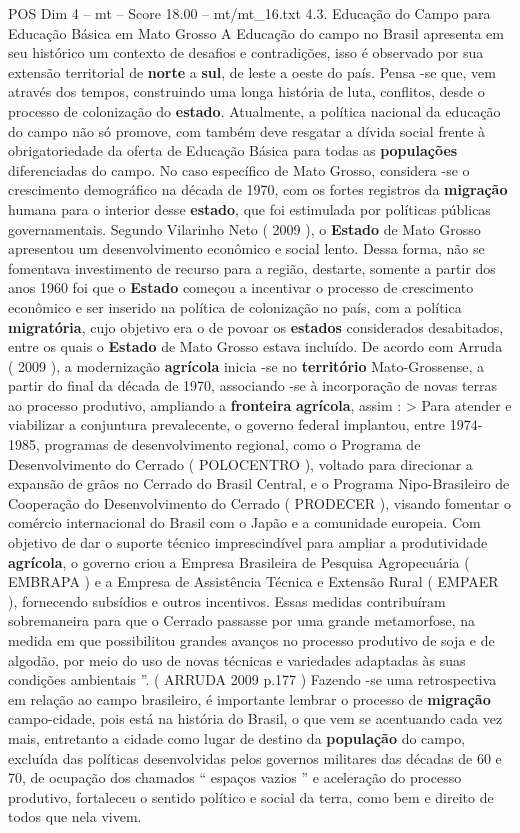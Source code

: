 \begin{textsample}{POS Dim 4 – mt – Score 18.00 – mt/mt\_16.txt}  \label{ex:f4_pos_171}
4.3.
Educação do Campo para Educação Básica em Mato Grosso A Educação do campo no Brasil apresenta em seu histórico um contexto de desafios e contradições, isso é observado por sua extensão territorial de \textbf{norte} a \textbf{sul}, de leste a oeste do país.
Pensa -se que, vem através dos tempos, construindo uma longa história de luta, conflitos, desde o processo de colonização do \textbf{estado}.
Atualmente, a política nacional da educação do campo não só promove, com também deve resgatar a dívida social frente à obrigatoriedade da oferta de Educação Básica para todas as \textbf{populações} diferenciadas do campo.
No caso específico de Mato Grosso, considera -se o crescimento demográfico na década de 1970, com os fortes registros da \textbf{migração} humana para o interior desse \textbf{estado}, que foi estimulada por políticas públicas governamentais.
Segundo Vilarinho Neto ( 2009 ), o \textbf{Estado} de Mato Grosso apresentou um desenvolvimento econômico e social lento.
Dessa forma, não se fomentava investimento de recurso para a região, destarte, somente a partir dos anos 1960 foi que o \textbf{Estado} começou a incentivar o processo de crescimento econômico e ser inserido na política de colonização no país, com a política \textbf{migratória}, cujo objetivo era o de povoar os \textbf{estados} considerados desabitados, entre os quais o \textbf{Estado} de Mato Grosso estava incluído.
De acordo com Arruda ( 2009 ), a modernização \textbf{agrícola} inicia -se no \textbf{território} Mato-Grossense, a partir do final da década de 1970, associando -se à incorporação de novas terras ao processo produtivo, ampliando a \textbf{fronteira} \textbf{agrícola}, assim : > Para atender e viabilizar a conjuntura prevalecente, o governo federal implantou, entre 1974-1985, programas de desenvolvimento regional, como o Programa de Desenvolvimento do Cerrado ( POLOCENTRO ), voltado para direcionar a expansão de grãos no Cerrado do Brasil Central, e o Programa Nipo-Brasileiro de Cooperação do Desenvolvimento do Cerrado ( PRODECER ), visando fomentar o comércio internacional do Brasil com o Japão e a comunidade europeia.
Com objetivo de dar o suporte técnico imprescindível para ampliar a produtividade \textbf{agrícola}, o governo criou a Empresa Brasileira de Pesquisa Agropecuária ( EMBRAPA ) e a Empresa de Assistência Técnica e Extensão Rural ( EMPAER ), fornecendo subsídios e outros incentivos.
Essas medidas contribuíram sobremaneira para que o Cerrado passasse por uma grande metamorfose, na medida em que possibilitou grandes avanços no processo produtivo de soja e de algodão, por meio do uso de novas técnicas e variedades adaptadas às suas condições ambientais ”. ( ARRUDA 2009 p.177 ) Fazendo -se uma retrospectiva em relação ao campo brasileiro, é importante lembrar o processo de \textbf{migração} campo-cidade, pois está na história do Brasil, o que vem se acentuando cada vez mais, entretanto a cidade como lugar de destino da \textbf{população} do campo, excluída das políticas desenvolvidas pelos governos militares das décadas de 60 e 70, de ocupação dos chamados “ espaços vazios ” e aceleração do processo produtivo, fortaleceu o sentido político e social da terra, como bem e direito de todos que nela vivem.

\end{textsample}
